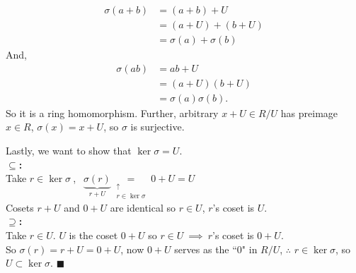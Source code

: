 \begin{lemma}
\begin{enumerate}[label=\roman*)]
\begin{align}
        \sigma(a+b)&= (a+b)+U \nonumber \\
        &= (a+U)+(b+U) \nonumber \\
        &= \sigma(a)+\sigma(b) \nonumber
    \end{align}
    And,
    \begin{align}
        \sigma(ab)&= ab+U \nonumber \\
        &= (a+U)(b+U) \nonumber \\
        &= \sigma(a)\sigma(b) \nonumber.
    \end{align}
    So it is a ring homomorphism. Further, arbitrary $x+U \in R/U$ has preimage $x\in R$, $\sigma(x)=x+U$, so $\sigma$ is surjective.

    Lastly, we want to show that $\ker \sigma = U$. \steezybreak\\
    \textbf{$\subseteq$:} \steezybreak\\
    Take $r\in \ker\sigma \ $, $\ \ \underbrace{\sigma(r)}_{r+U}\underset{\substack{\uparrow \\ r\in \ker\sigma}}{=} 0+U=U$ \\ Cosets $r+U$ and $0+U$ are identical so $r\in U$, $r$'s coset is $U$.\\
    \textbf{$\supseteq$:} \steezybreak\\
    Take $r\in U$. $U$ is the coset $0+U$ so $r\in U \ \implies \ r$'s coset is $0+U$. \steezybreak\\
    So $\sigma(r)=r+U=0+U$, now $0+U$ serves as the ``$0$" in $R/U$, $\therefore$ $r\in \ker \sigma$, so $U\subset \ker \sigma$. $\blacksquare$
\end{enumerate}

\end{lemma}
\newpage
